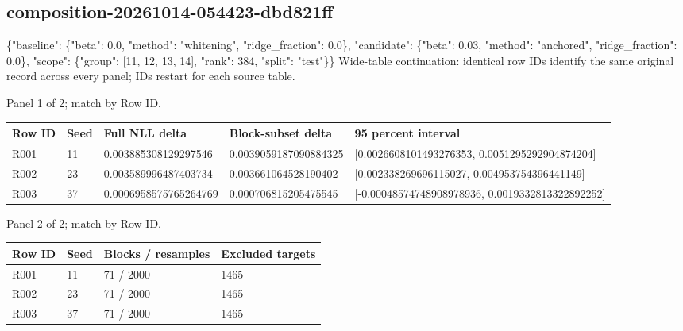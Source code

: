 \documentclass[10pt]{article}
\begin{document}
\subsection{composition-20261014-054423-dbd821ff}
\{"baseline": \{"beta": 0.0, "method": "whitening", "ridge\_fraction": 0.0\}, "candidate": \{"beta": 0.03, "method": "anchored", "ridge\_fraction": 0.0\}, "scope": \{"group": [11, 12, 13, 14], "rank": 384, "split": "test"\}\}
Wide-table continuation: identical row IDs identify the same original record across every panel; IDs restart for each source table.
\par\noindent Panel 1 of 2; match by Row ID.
{\scriptsize\setlength{\tabcolsep}{2pt}
\begin{longtable}{p{}p{}p{}p{}p{}}
Row ID & Seed & Full NLL delta & Block-subset delta & 95 percent interval \\
\hline\endhead
R001 & 11 & 0.003885308129297546 & 0.0039059187090884325 & [0.0026608101493276353, 0.0051295292904874204] \\
R002 & 23 & 0.003589996487403734 & 0.003661064528190402 & [0.002338269696115027, 0.004953754396441149] \\
R003 & 37 & 0.0006958575765264769 & 0.000706815205475545 & [-0.00048574748908978936, 0.0019332813322892252] \\
\end{longtable}}
\par\noindent Panel 2 of 2; match by Row ID.
{\scriptsize\setlength{\tabcolsep}{2pt}
\begin{longtable}{p{}p{}p{}p{}}
Row ID & Seed & Blocks / resamples & Excluded targets \\
\hline\endhead
R001 & 11 & 71 / 2000 & 1465 \\
R002 & 23 & 71 / 2000 & 1465 \\
R003 & 37 & 71 / 2000 & 1465 \\
\end{longtable}}
\end{document}
